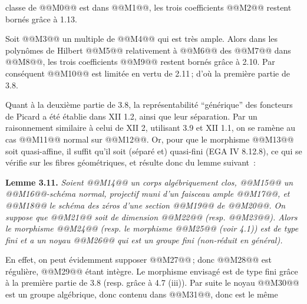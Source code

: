 
classe de @@M0@@ est dans @@M1@@, les trois coefficients @@M2@@ restent born\'es gr\^ace \`a 1.13.

Soit @@M3@@ un multiple de @@M4@@ qui est tr\`es ample. Alors dans les polyn\^omes de Hilbert @@M5@@ relativement \`a @@M6@@ des @@M7@@ dans @@M8@@, les trois coefficients @@M9@@ restent born\'es gr\^ace \`a 2.10. Par cons\'equent @@M10@@ est limit\'ee en vertu de 2.11\,; d'o\`u la premi\`ere partie de 3.8.

Quant \`a la deuxi\`eme partie de 3.8, la repr\'esentabilit\'e ``g\'en\'erique'' des foncteurs de Picard a \'et\'e \'etablie dans XII 1.2, ainsi que leur s\'eparation. Par un raisonnement similaire \`a celui de XII 2, utilisant 3.9 et XII 1.1, on se ram\`ene au cas @@M11@@ normal sur @@M12@@. Or, pour que le morphisme @@M13@@ soit quasi-affine, il suffit qu'il soit (s\'epar\'e et) quasi-fini (EGA IV 8.12.8), ce qui se v\'erifie sur les fibres g\'eom\'etriques, et r\'esulte donc du lemme suivant~:

\textbf{Lemme 3.11.} \emph{Soient @@M14@@ un corps alg\'ebriquement clos, @@M15@@ un @@M16@@-sch\'ema normal, projectif muni d'un faisceau ample @@M17@@, et @@M18@@ le sch\'ema des z\'eros d'une section @@M19@@ de @@M20@@. On suppose que @@M21@@ soit de dimension @@M22@@ (resp. @@M23@@). Alors le morphisme @@M24@@ (resp. le morphisme @@M25@@ (voir 4.1)) est de type fini et a un noyau @@M26@@ qui est un groupe fini (non-r\'eduit en g\'en\'eral).}

En effet, on peut \'evidemment supposer @@M27@@\,; donc @@M28@@ est r\'eguli\`ere, @@M29@@ \'etant int\`egre. Le morphisme envisag\'e est de type fini gr\^ace \`a la premi\`ere partie de 3.8 (resp. gr\^ace \`a 4.7 (iii)). Par suite le noyau @@M30@@ est un groupe alg\'ebrique, donc contenu dans @@M31@@, donc est le m\^eme

